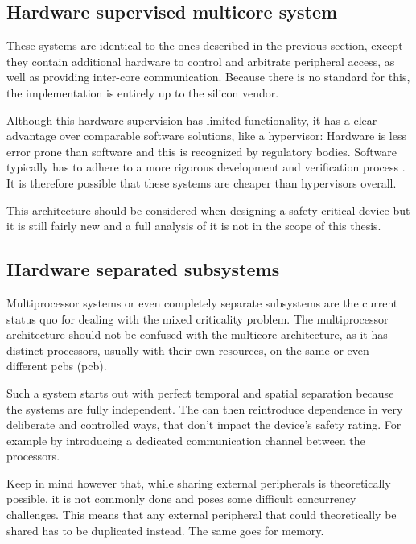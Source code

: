 \subsection{Hardware supervised multicore system}
These systems are identical to the ones described in the previous section, except they contain additional hardware to control and arbitrate peripheral access, as well as providing inter-core communication.
Because there is no standard for this, the implementation is entirely up to the silicon vendor. 

Although this hardware supervision has limited functionality, it has a clear advantage over comparable software solutions, like a hypervisor: Hardware is less error prone than software and this is recognized by regulatory bodies. Software typically has to adhere to a more rigorous development and verification process \cite{IEC.2010-3}. It is therefore possible that these systems are cheaper than hypervisors overall. 

This architecture should be considered when designing a safety-critical device but it is still fairly new and a full analysis of it is not in the scope of this thesis.
\subsection{Hardware separated subsystems \label{HSS}}
Multiprocessor systems or even completely separate subsystems are the current status quo for dealing with the mixed criticality problem. The multiprocessor architecture should not be confused with the multicore architecture, as it has distinct processors, usually with their own resources, on the same or even different \acrlong{pcb}s (\acrshort{pcb}).

Such a system starts out with perfect temporal and spatial separation because the systems are fully independent. The \mfg{} can then reintroduce dependence in very deliberate and controlled ways, that don't impact the device's safety rating. For example by introducing a dedicated communication channel between the processors. 

Keep in mind however that, while sharing external peripherals is theoretically possible, it is not commonly done and poses some difficult concurrency challenges. This means that any external peripheral that could theoretically be shared has to be duplicated instead. The same goes for memory.

